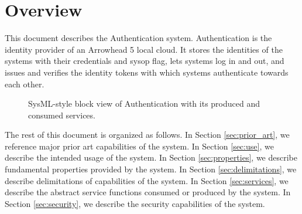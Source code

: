 \documentclass[a4paper]{arrowhead}
\begin{document}
\section{Overview}
\label{sec:overview}

This document describes the Authentication system. Authentication is the identity provider of an Arrowhead 5 local cloud. It stores the identities of the systems with their credentials and sysop flag, lets systems log in and out, and issues and verifies the identity tokens with which systems authenticate towards each other.

\begin{figure}[ht!]
  \centering
  \caption{SysML-style block view of Authentication with its produced and consumed services.}
  \label{fig:system}
\end{figure}

The rest of this document is organized as follows.
In Section \ref{sec:prior_art}, we reference major prior art capabilities of the system.
In Section \ref{sec:use}, we describe the intended usage of the system.
In Section \ref{sec:properties}, we describe fundamental properties provided by the system.
In Section \ref{sec:delimitations}, we describe delimitations of capabilities of the system.
In Section \ref{sec:services}, we describe the abstract service functions consumed or produced by the system.
In Section \ref{sec:security}, we describe the security capabilities of the system.
\end{document}
